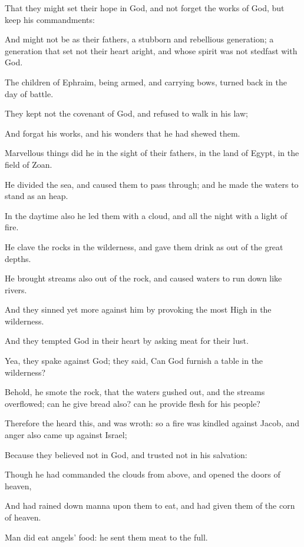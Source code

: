 \verse That they might set their hope in God, and not forget the works of God, but keep his commandments:

\verse And might not be as their fathers, a stubborn and rebellious generation; a generation that set not their heart aright, and whose spirit was not stedfast with God.

\verse The children of Ephraim, being armed, and carrying bows, turned back in the day of battle.

\verse They kept not the covenant of God, and refused to walk in his law;

\verse And forgat his works, and his wonders that he had shewed them.

\verse Marvellous things did he in the sight of their fathers, in the land of Egypt, in the field of Zoan.

\verse He divided the sea, and caused them to pass through; and he made the waters to stand as an heap.

\verse In the daytime also he led them with a cloud, and all the night with a light of fire.

\verse He clave the rocks in the wilderness, and gave them drink as out of the great depths.

\verse He brought streams also out of the rock, and caused waters to run down like rivers.

\verse And they sinned yet more against him by provoking the most High in the wilderness.

\verse And they tempted God in their heart by asking meat for their lust.

\verse Yea, they spake against God; they said, Can God furnish a table in the wilderness?

\verse Behold, he smote the rock, that the waters gushed out, and the streams overflowed; can he give bread also? can he provide flesh for his people?

\verse Therefore the \LORD heard this, and was wroth: so a fire was kindled against Jacob, and anger also came up against Israel;

\verse Because they believed not in God, and trusted not in his salvation:

\verse Though he had commanded the clouds from above, and opened the doors of heaven,

\verse And had rained down manna upon them to eat, and had given them of the corn of heaven.

\verse Man did eat angels' food: he sent them meat to the full.

